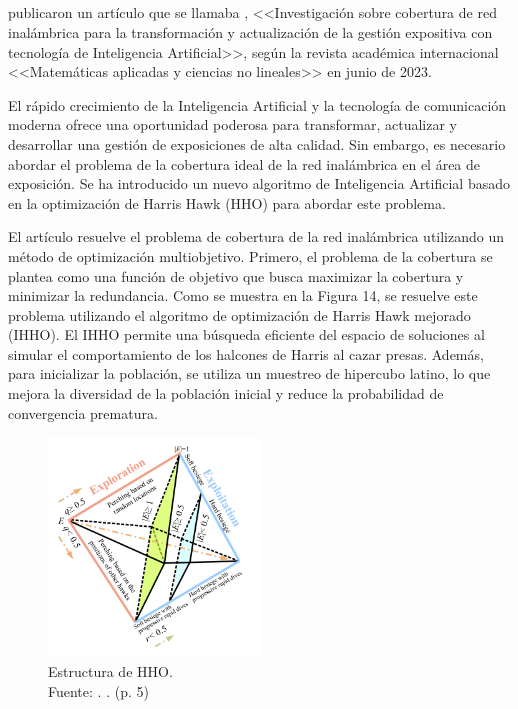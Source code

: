 \subsection{}
\cite{pr_dou2023researchwir} publicaron un artículo que se llamaba , <<Investigación sobre cobertura de red inalámbrica para la transformación y actualización de la gestión expositiva con tecnología de Inteligencia Artificial>>, según la revista académica internacional <<Matemáticas aplicadas y ciencias no lineales>> en junio de 2023.

El rápido crecimiento de la Inteligencia Artificial y la tecnología de comunicación moderna ofrece una oportunidad poderosa para transformar, actualizar y desarrollar una gestión de exposiciones de alta calidad. Sin embargo, es necesario abordar el problema de la cobertura ideal de la red inalámbrica en el área de exposición. Se ha introducido un nuevo algoritmo de Inteligencia Artificial basado en la optimización de Harris Hawk (HHO) para abordar este problema.

El artículo resuelve el problema de cobertura de la red inalámbrica utilizando un método de optimización multiobjetivo. Primero, el problema de la cobertura se plantea como una función de objetivo que busca maximizar la cobertura y minimizar la redundancia. Como se muestra en la Figura 14, se resuelve este problema utilizando el algoritmo de optimización de Harris Hawk mejorado (IHHO). El IHHO permite una búsqueda eficiente del espacio de soluciones al simular el comportamiento de los halcones de Harris al cazar presas. Además, para inicializar la población, se utiliza un muestreo de hipercubo latino, lo que mejora la diversidad de la población inicial y reduce la probabilidad de convergencia prematura.

\begin{figure}[!ht]
	\begin{center}
		\includegraphics[width=0.5\textwidth]{2/figures/dou2023.png}
		\caption[Estructura de HHO]{Estructura de HHO.\\
		Fuente: \cite{pr_dou2023researchwir}. . (p. 5)}
		\label{2:fig123}
	\end{center}
\end{figure}

